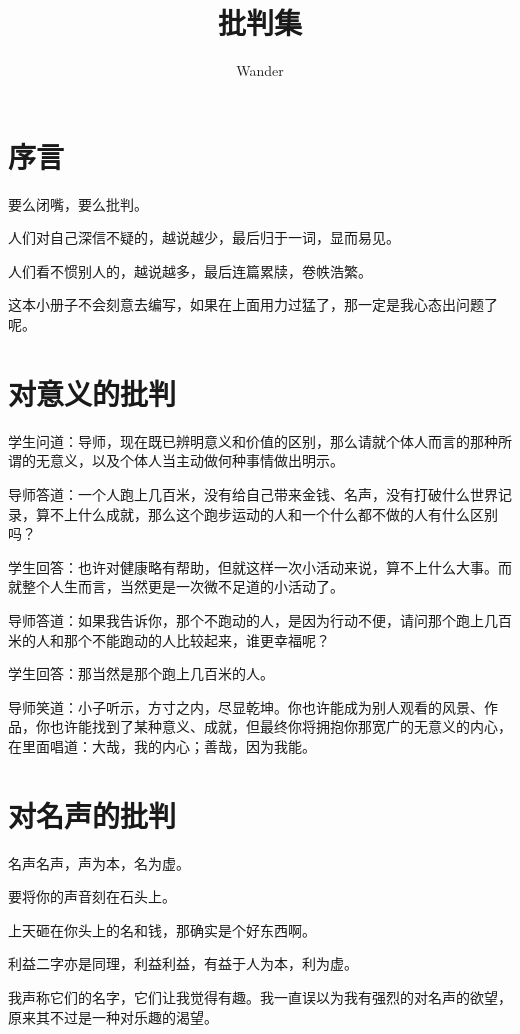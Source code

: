\documentclass[12pt,oneside]{book}
\title{批判集}
\author{Wander}
\begin{document}
\makemytitle
{}

\frontmatter 
{}
\chapter*{序言}
要么闭嘴，要么批判。

人们对自己深信不疑的，越说越少，最后归于一词，显而易见。

人们看不惯别人的，越说越多，最后连篇累牍，卷帙浩繁。

这本小册子不会刻意去编写，如果在上面用力过猛了，那一定是我心态出问题了呢。


\setcounter{tocdepth}{2}    
\tableofcontents


\mainmatter


\chapter{对意义的批判}
学生问道：导师，现在既已辨明意义和价值的区别，那么请就个体人而言的那种所谓的无意义，以及个体人当主动做何种事情做出明示。

导师答道：一个人跑上几百米，没有给自己带来金钱、名声，没有打破什么世界记录，算不上什么成就，那么这个跑步运动的人和一个什么都不做的人有什么区别吗？

学生回答：也许对健康略有帮助，但就这样一次小活动来说，算不上什么大事。而就整个人生而言，当然更是一次微不足道的小活动了。

导师答道：如果我告诉你，那个不跑动的人，是因为行动不便，请问那个跑上几百米的人和那个不能跑动的人比较起来，谁更幸福呢？

学生回答：那当然是那个跑上几百米的人。

导师笑道：小子听示，方寸之内，尽显乾坤。你也许能成为别人观看的风景、作品，你也许能找到了某种意义、成就，但最终你将拥抱你那宽广的无意义的内心，在里面唱道：大哉，我的内心；善哉，因为我能。



\chapter{对名声的批判}
名声名声，声为本，名为虚。

要将你的声音刻在石头上。

上天砸在你头上的名和钱，那确实是个好东西啊。

利益二字亦是同理，利益利益，有益于人为本，利为虚。

我声称它们的名字，它们让我觉得有趣。我一直误以为我有强烈的对名声的欲望，原来其不过是一种对乐趣的渴望。
\end{document}
